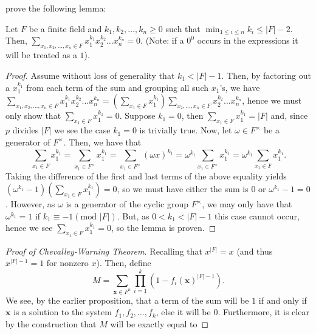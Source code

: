 	prove the following lemma: \begin{lemma}[Lemma] Let $F$ be a finite
		field and $k_1, k_2, \ldots, k_{n} \ge 0$ such that $\min _{1
		\le i \le n} k_{i} \le \left| F \right|  - 2$. Then,
		$\sum_{x_1, x_2, \ldots, x_{n} \in F}^{}
		x_1^{k_1}x_2^{k_2}\ldots x_{n}^{k_{n}} = 0.$ (Note: if a
		$0^{0}$ occurs in the expressions it will be treated as a $1$).
		\end{lemma} \begin{proof}[Proof] Assume without loss of
		generality that $k_1 < \left| F  \right| -1$. Then, by factoring out a $x_1^{k_1}$ from each term of the sum and grouping all such $x_1$'s, we have
		$\sum_{x_1, x_2, \ldots, x_{n} \in F}^{}
		x_1^{k_1}x_2^{k_2}\ldots x_{n}^{k_{n}} = \left( \sum_{x_1 \in
		F}^{} x_1^{k_1} \right) \sum_{x_2, \ldots, x_{n} \in F}^{} x_2^{k_2}\ldots x_{n} ^{ k_{n}}$, hence we must
		only show that $\sum_{x_1 \in F}^{} x_1^{k_1}= 0$. Suppose $k_1
		= 0$, then $\sum_{x_1 \in F}^{}x_1^{k_1} = \left| F \right| $ and,
		since $p$ divides  $\left|  F \right|$ we see the case $k_1 =
		0$ is trivially true. Now, let $\omega \in F^{\times}$ be a
		generator of $F^{\times}$. Then, we have that \[ \sum_{x_1 \in
			F}^{}x_1 ^{ k_1} = \sum_{x_1 \in F^{\times}}^{}x_1 ^{
		k_1} = \sum_{x_1 \in F^{\times}}^{}\left( \omega x \right) ^{
	k_1} = \omega ^{ k_1} \sum_{x_1 \in F^{ \times}}^{} x_1 ^{ k_1}= \omega
^{ k_1}\sum_{x_1 \in F}^{}x_1 ^{ k_1} .\] Taking the difference of the first and last terms of the above equality yields $\left(
	\omega ^{ k_1} - 1 \right) \left( \sum_{x_1 \in F}^{} x_1 ^{
	k_1}\right) = 0$, so we must have either the sum is $0$ or $\omega
	^{k_1} -1 = 0$. However, as $\omega$ is a generator of the cyclic group
	$F^{ \times}$, we may only have that $\omega ^{ k_1} = 1$ if $k_1
\equiv -1 \left( \text{mod } \left| F \right|  \right) $.  But, as $0 < k_1 <
\left| F \right| -1$ this case cannot occur, hence we see $\sum_{x_1 \in F}^{}
x_1 ^{ k_1} = 0$, so the lemma is proven.  \end{proof} \begin{proof}[Proof of
Chevalley-Warning Theorem] Recalling that $x^{\left|  F \right| } = x$ (and
thus $x^{\left| F \right| -1} = 1$ for nonzero $x$). Then, define  \[ M =
	\sum_{\textbf{x} \in F^{n}}^{} \prod_{i= 1}^{k} \left( 1 - f_{i}\left(
\textbf{x} \right) ^{\left| F \right| -1} \right) .\] We see, by the earlier
proposition, that a term of the sum will be $1$ if and only if $\textbf{x}$ is
a solution to the system $f_1, f_2, \ldots, f_{k}$, else it will be $0$.
Furthermore, it is clear by the construction that $M$ will be exactly equal to

\end{proof}
